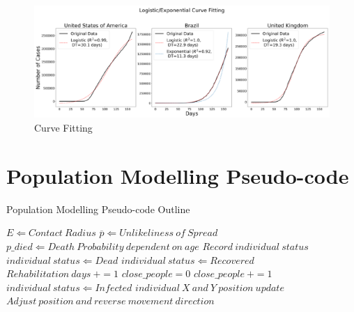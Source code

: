 \begin{appendices}
\begin{figure}[ht!]%
    \centering
    \includegraphics[width=1\linewidth]{latex/images/fitting.pdf}
    \caption{Curve Fitting}
\end{figure}

\clearpage
\section{Population Modelling Pseudo-code}
\label{code_alg}

\begin{algorithm}
\caption{Population Modelling Pseudo-code Outline}
\label{alg1}
\begin{algorithmic}[1]
  \STATE $E \Leftarrow Contact\:Radius$
  \STATE $\overline{p} \Leftarrow Unlikeliness\:of\:Spread$
  \STATE $p\_died \Leftarrow Death\:Probability\:dependent\:on\:age$
      \STATE$Record\:individual\:status$
        \STATE $individual\:status \Leftarrow Dead$
      \ELSE
          \STATE $individual\:status \Leftarrow Recovered$
        \ENDIF
        \STATE $Rehabilitation\:days\:+= 1$
      \ENDIF
        \STATE $close\_people = 0$
        \STATE $close\_people\:+= 1$
        \ENDIF
        \ENDFOR
          \STATE $individual\:status \Leftarrow Infected$
        \ENDIF
      \ENDIF
          \STATE $individual\:X\:and\:Y\:position\:update$
            \STATE $Adjust\:position\:and\:reverse\:movement\:direction$
          \ENDIF
      \ENDIF
  \ENDFOR
\ENDFOR
\end{algorithmic}
\end{algorithm}


\end{appendices}
